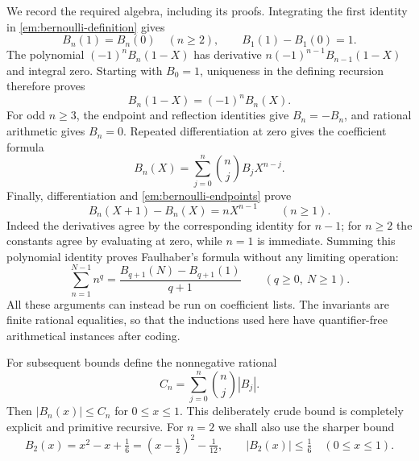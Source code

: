 We record the required algebra, including its proofs.  Integrating the
first identity in \eqref{em:bernoulli-definition} gives
\begin{equation}
 B_n(1)=B_n(0)\quad(n\geq2),\qquad B_1(1)-B_1(0)=1.
 \label{em:bernoulli-endpoints}
\end{equation}
The polynomial $(-1)^n B_n(1-X)$ has derivative
$n(-1)^{n-1}B_{n-1}(1-X)$ and integral zero.  Starting with $B_0=1$,
uniqueness in the defining recursion therefore proves
\begin{equation}
 B_n(1-X)=(-1)^nB_n(X).
 \label{em:bernoulli-reflection}
\end{equation}
For odd $n\geq3$, the endpoint and reflection identities give
$B_n=-B_n$, and rational arithmetic gives $B_n=0$.
Repeated differentiation at zero gives the coefficient formula
\begin{equation}
 B_n(X)=\sum_{j=0}^n\binom nj B_jX^{n-j}.
 \label{em:bernoulli-coefficients}
\end{equation}
Finally, differentiation and \eqref{em:bernoulli-endpoints} prove
\begin{equation}
 B_n(X+1)-B_n(X)=nX^{n-1}\qquad(n\geq1).
 \label{em:bernoulli-difference}
\end{equation}
Indeed the derivatives agree by the corresponding identity for $n-1$;
for $n\geq2$ the constants agree by evaluating at zero, while $n=1$
is immediate.  Summing this polynomial identity proves Faulhaber's formula
without any limiting operation:
\begin{equation}
 \sum_{n=1}^{N-1}n^q
   =\frac{B_{q+1}(N)-B_{q+1}(1)}{q+1}
       \qquad(q\geq0,\ N\geq1).
 \label{em:faulhaber}
\end{equation}
All these arguments can instead be run on coefficient lists.  The
invariants are finite rational equalities, so that the inductions used
here have quantifier-free arithmetical instances after coding.

For subsequent bounds define the nonnegative rational
\begin{equation}
 C_n=\sum_{j=0}^n\binom nj|B_j|.
 \label{em:bernoulli-bound}
\end{equation}
Then $|B_n(x)|\leq C_n$ for $0\leq x\leq1$.  This deliberately crude
bound is completely explicit and primitive recursive.  For $n=2$ we
shall also use the sharper bound
\begin{equation}
 B_2(x)=x^2-x+\tfrac16=(x-\tfrac12)^2-\tfrac1{12},
 \qquad |B_2(x)|\leq\tfrac16\quad(0\leq x\leq1).
 \label{em:B2-bound}
\end{equation}

